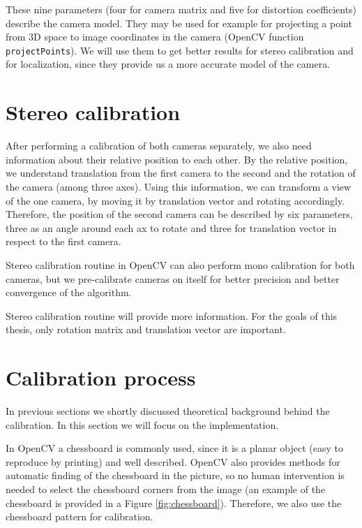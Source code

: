 These nine parameters (four for camera matrix and five for distortion
coefficients) describe the camera model. They may be used for example for
projecting a point from 3D space to image coordinates in the camera (OpenCV
function \verb+projectPoints+). We will use them to get better results for
stereo calibration and for localization, since they provide us a more accurate
model of the camera.



\section{Stereo calibration}

After performing a calibration of both cameras separately, we also need
information about their relative position to each other. By the relative
position, we understand translation from the first camera to the second and the
rotation of the camera (among three axes). Using this information, we can
transform a view of the one camera, by moving it by translation vector and
rotating accordingly. Therefore, the position of the second camera can be
described by six parameters, three as an angle around each ax to rotate and
three for translation vector in respect to the first camera.

Stereo calibration routine in OpenCV can also perform mono calibration for both
cameras, but we pre-calibrate cameras on itself for better precision and better
convergence of the algorithm.

Stereo calibration routine will provide more information. For the goals of this
thesis, only rotation matrix and translation vector are important.

\section{Calibration process}

In previous sections we shortly discussed theoretical background behind the
calibration. In this section we will focus on the implementation.

In OpenCV a chessboard is commonly used, since it is a planar object (easy to
reproduce by printing) and well described. OpenCV also provides methods for
automatic finding of the chessboard in the picture, so no human intervention is
needed to select the chessboard corners from the image (an example of the
chessboard is provided in a Figure \ref{fig:chessboard}). Therefore, we also
use the chessboard pattern for calibration.

